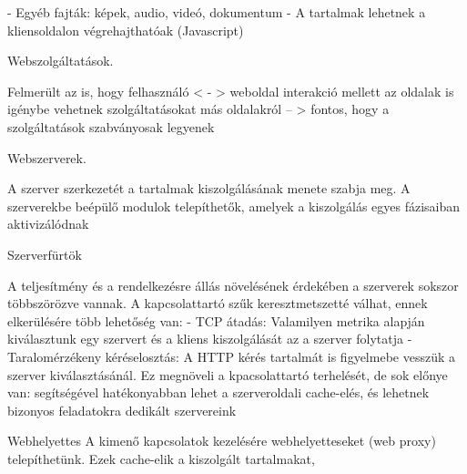 \documentclass[twoside, a4paper, 12pt]{article}
\begin{document}
\begin{description}
                                                                        - Egyéb fajták: képek, audio, videó, dokumentum
                                                                        - A tartalmak lehetnek a kliensoldalon végrehajthatóak (Javascript)
                                                                    \item  Webszolgáltatások.
                                                                    \item Felmerült az is, hogy felhasználó < - > weboldal interakció mellett az oldalak is igénybe vehetnek szolgáltatásokat más
                                                                        oldalakról -- > fontos, hogy a szolgáltatások szabványosak legyenek
                                                                    \item  Webszerverek.
                                                                    \item A szerver szerkezetét a tartalmak kiszolgálásának menete szabja meg. A szerverekbe beépülő modulok telepíthetők,
                                                                        amelyek a kiszolgálás egyes fázisaiban aktivizálódnak
                                                                    \item  Szerverfürtök    
                                                                    \item A teljesítmény és a rendelkezésre állás növelésének érdekében a szerverek sokszor többszörözve vannak.
                                                                        A kapcsolattartó szűk keresztmetszetté válhat, ennek elkerülésére több lehetőség van:
                                                                        - TCP átadás: Valamilyen metrika alapján kiválasztunk egy szervert és a kliens kiszolgálását az a szerver folytatja
                                                                        - Taralomérzékeny kéréselosztás: A HTTP kérés tartalmát is figyelmebe vesszük a szerver kiválasztásánál. Ez megnöveli
                                                                        a kpacsolattartó terhelését, de sok előnye van: segítségével hatékonyabban lehet a szerveroldali cache-elés, és lehetnek
                                                                        bizonyos feladatokra dedikált szervereink
                                                                    \item  Webhelyettes
                                                                        A kimenő kapcsolatok kezelésére webhelyetteseket (web proxy) telepíthetünk. Ezek cache-elik a kiszolgált tartalmakat,

\end{description}
\end{document}

